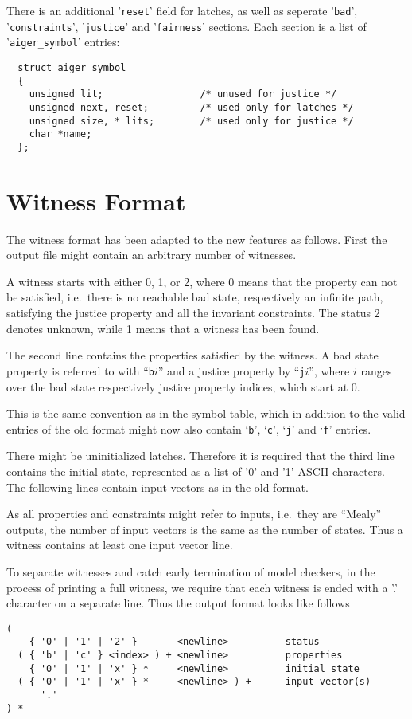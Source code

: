 \documentclass{llncs}
\begin{document}
There is an additional '\texttt{reset}' field for latches, as well as 
seperate '\texttt{bad}', '\texttt{constraints}', '\texttt{justice}' and
'\texttt{fairness}' sections.  Each section
is a list of '\texttt{aiger\_symbol}' entries:

{\small
\begin{verbatim}
  struct aiger_symbol
  {
    unsigned lit;                 /* unused for justice */
    unsigned next, reset;         /* used only for latches */
    unsigned size, * lits;        /* used only for justice */
    char *name;
  };
\end{verbatim}}

\section{Witness Format}

The witness format has been adapted to the new features as follows.
First the output file might contain an arbitrary number of witnesses.

A witness starts with either 0, 1, or 2, where 0 means that the property can
not be satisfied, i.e.~there is no reachable bad state, respectively an
infinite path, satisfying the justice property and all the invariant
constraints.  The status 2 denotes unknown, while 1 means that a witness has
been found.

The second line contains the properties satisfied by the witness.
A bad state property is referred to with ``\texttt{b}$i$'' and a
justice property by ``\texttt{j}$i$'', where $i$ ranges over the bad
state respectively justice property indices, which start at 0.

This is the same convention as in the symbol table, which in addition
to the valid entries of the old format might now also contain
`\texttt{b}', `\texttt{c}', `\texttt{j}' and
`\texttt{f}' entries.

There might be uninitialized latches.  Therefore it is required that the third
line contains the initial state, represented as a list of '0' and '1' ASCII
characters.  The following lines contain input vectors as in the old format.

As all properties and constraints might refer to inputs, i.e.~they are ``Mealy''
outputs, the number of input vectors is the same as the number of states.
Thus a witness contains at least one input vector line.

To separate witnesses and catch early termination of model checkers, in the
process of printing a full witness, we require that each witness is
ended with a '.' character on a separate line.
Thus the output format looks like follows
{\small
\begin{verbatim}
(
    { '0' | '1' | '2' }       <newline>          status
  ( { 'b' | 'c' } <index> ) + <newline>          properties
    { '0' | '1' | 'x' } *     <newline>          initial state
  ( { '0' | '1' | 'x' } *     <newline> ) +      input vector(s)
      '.'
) *
\end{verbatim}}
\end{document}
